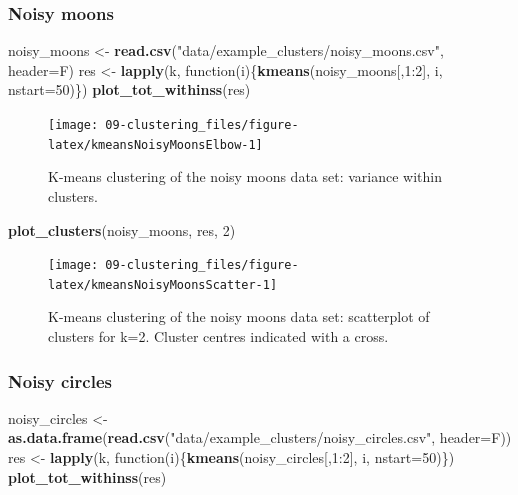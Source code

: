 \documentclass[]{book}
\newenvironment{Shaded}{\begin{snugshade}}{\end{snugshade}}
\newcommand{\KeywordTok}[1]{\textcolor[rgb]{0.13,0.29,0.53}{\textbf{{#1}}}}
\newcommand{\DataTypeTok}[1]{\textcolor[rgb]{0.13,0.29,0.53}{{#1}}}
\newcommand{\DecValTok}[1]{\textcolor[rgb]{0.00,0.00,0.81}{{#1}}}
\newcommand{\StringTok}[1]{\textcolor[rgb]{0.31,0.60,0.02}{{#1}}}
\newcommand{\NormalTok}[1]{{#1}}
\theoremstyle{definition}
\theoremstyle{definition}
\theoremstyle{definition}
\theoremstyle{remark}
\begin{document}
\subsubsection{Noisy moons}\label{noisy-moons}

\begin{Shaded}
\begin{Highlighting}[]
\NormalTok{noisy_moons <-}\StringTok{ }\KeywordTok{read.csv}\NormalTok{(}\StringTok{"data/example_clusters/noisy_moons.csv"}\NormalTok{, }\DataTypeTok{header=}\NormalTok{F)}
\NormalTok{res <-}\StringTok{ }\KeywordTok{lapply}\NormalTok{(k, function(i)\{}\KeywordTok{kmeans}\NormalTok{(noisy_moons[,}\DecValTok{1}\NormalTok{:}\DecValTok{2}\NormalTok{], i, }\DataTypeTok{nstart=}\DecValTok{50}\NormalTok{)\})}
\KeywordTok{plot_tot_withinss}\NormalTok{(res)}
\end{Highlighting}
\end{Shaded}

\begin{figure}

{\centering \texttt{[image: 09-clustering\_files/figure-latex/kmeansNoisyMoonsElbow-1]} 

}

\caption{K-means clustering of the noisy moons data set: variance within clusters.}\label{fig:kmeansNoisyMoonsElbow}
\end{figure}

\begin{Shaded}
\begin{Highlighting}[]
\KeywordTok{plot_clusters}\NormalTok{(noisy_moons, res, }\DecValTok{2}\NormalTok{)}
\end{Highlighting}
\end{Shaded}

\begin{figure}

{\centering \texttt{[image: 09-clustering\_files/figure-latex/kmeansNoisyMoonsScatter-1]} 

}

\caption{K-means clustering of the noisy moons data set: scatterplot of clusters for k=2. Cluster centres indicated with a cross.}\label{fig:kmeansNoisyMoonsScatter}
\end{figure}

\subsubsection{Noisy circles}\label{noisy-circles}

\begin{Shaded}
\begin{Highlighting}[]
\NormalTok{noisy_circles <-}\StringTok{ }\KeywordTok{as.data.frame}\NormalTok{(}\KeywordTok{read.csv}\NormalTok{(}\StringTok{"data/example_clusters/noisy_circles.csv"}\NormalTok{, }\DataTypeTok{header=}\NormalTok{F))}
\NormalTok{res <-}\StringTok{ }\KeywordTok{lapply}\NormalTok{(k, function(i)\{}\KeywordTok{kmeans}\NormalTok{(noisy_circles[,}\DecValTok{1}\NormalTok{:}\DecValTok{2}\NormalTok{], i, }\DataTypeTok{nstart=}\DecValTok{50}\NormalTok{)\})}
\KeywordTok{plot_tot_withinss}\NormalTok{(res)}
\end{Highlighting}
\end{Shaded}
\end{document}
